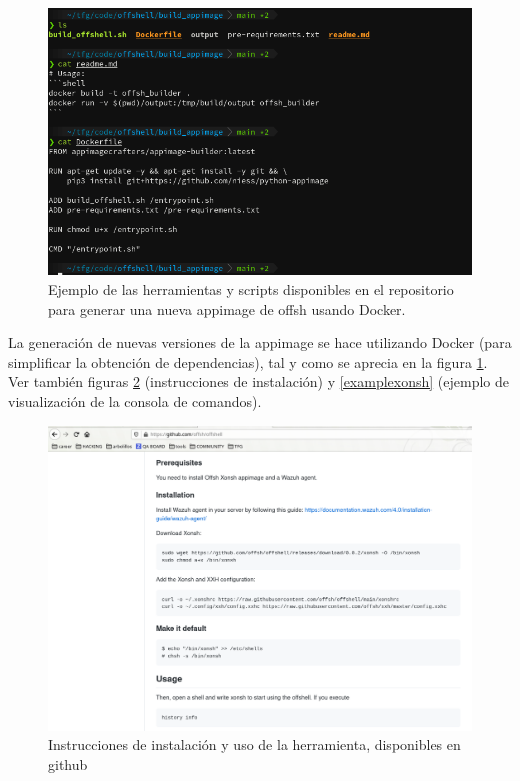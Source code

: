 \begin{figure}[!hbt]
  \centering
  \includegraphics[width=\textwidth]{imagenes/build_appimage.png}
  \caption{Ejemplo de las herramientas y scripts disponibles en el repositorio para generar una nueva appimage de offsh usando Docker.}
  \label{appimage_build}
\end{figure}

La generación de nuevas versiones de la appimage se hace utilizando Docker (para simplificar la obtención de dependencias), tal y como se aprecia en la figura \ref{appimage_build}. Ver también figuras \ref{instructions} (instrucciones de instalación) y \ref{examplexonsh} (ejemplo de visualización de la consola de comandos).

\begin{figure}[!hbt]
  \centering
  \includegraphics[width=\textwidth]{imagenes/offsh_instructions.png}
  \caption{Instrucciones de instalación y uso de la herramienta, disponibles en github}
  \label{instructions}
\end{figure}

